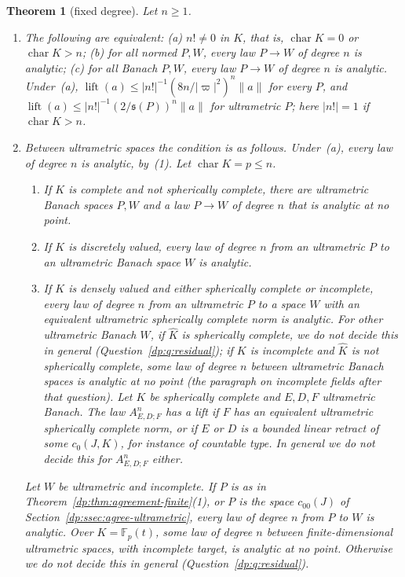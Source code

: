 \documentclass[11pt]{amsart}
\newtheorem{theorem}{Theorem}[section]
\theoremstyle{definition}
\theoremstyle{remark}
\numberwithin{equation}{section}
\newcommand{\F}{\mathbb F}
\newcommand{\abs}[1]{\lvert #1\rvert}
\newcommand{\norm}[1]{\lVert #1\rVert}
\newcommand{\Kh}{\widehat K}
\theoremstyle{plain}
\theoremstyle{definition}
\theoremstyle{plain}
\begin{document}
\begin{theorem}[fixed degree]\label{dp:thm:degree-threshold}
Let $n\ge1$.
\begin{enumerate}
\item The following are equivalent: \textup{(a)} $n!\ne0$ in $K$, that is, $\operatorname{char}K=0$ or $\operatorname{char}K>n$; \textup{(b)} for all normed $P,W$, every law $P\to W$ of degree $n$ is analytic; \textup{(c)} for all Banach $P,W$, every law $P\to W$ of degree $n$ is analytic. Under~\textup{(a)}, $\operatorname{lift}(a)\le\abs{n!}^{-1}(8n/\abs\varpi^2)^n\norm a$ for every $P$, and $\operatorname{lift}(a)\le\abs{n!}^{-1}(2/\mathfrak s(P))^n\norm a$ for ultrametric $P$; here $\abs{n!}=1$ if $\operatorname{char}K>n$.
\item Between ultrametric spaces the condition is as follows. Under~\textup{(a)}, every law of degree $n$ is analytic, by~\textup{(1)}. Let $\operatorname{char}K=p\le n$.
\begin{enumerate}
\item If $K$ is complete and not spherically complete, there are ultrametric Banach spaces $P,W$ and a law $P\to W$ of degree $n$ that is analytic at no point.
\item If $K$ is discretely valued, every law of degree $n$ from an ultrametric $P$ to an ultrametric Banach space $W$ is analytic.
\item If $K$ is densely valued and either spherically complete or incomplete, every law of degree $n$ from an ultrametric $P$ to a space $W$ with an equivalent ultrametric spherically complete norm is analytic. For other ultrametric Banach $W$, if $\Kh$ is spherically complete, we do not decide this in general (Question~\ref{dp:q:residual}); if $K$ is incomplete and $\Kh$ is not spherically complete, some law of degree $n$ between ultrametric Banach spaces is analytic at no point (the paragraph on incomplete fields after that question). Let $K$ be spherically complete and $E,D,F$ ultrametric Banach. The law $A^n_{E,D;F}$ has a lift if $F$ has an equivalent ultrametric spherically complete norm, or if $E$ or $D$ is a bounded linear retract of some $c_0(J,K)$, for instance of countable type. In general we do not decide this for $A^n_{E,D;F}$ either.
\end{enumerate}
Let $W$ be ultrametric and incomplete. If $P$ is as in Theorem~\ref{dp:thm:agreement-finite}(1), or $P$ is the space $c_{00}(J)$ of Section~\ref{dp:ssec:agree-ultrametric}, every law of degree $n$ from $P$ to $W$ is analytic. Over $K=\F_p(t)$, some law of degree $n$ between finite-dimensional ultrametric spaces, with incomplete target, is analytic at no point. Otherwise we do not decide this in general (Question~\ref{dp:q:residual}).
\end{enumerate}
\end{theorem}
\end{document}
